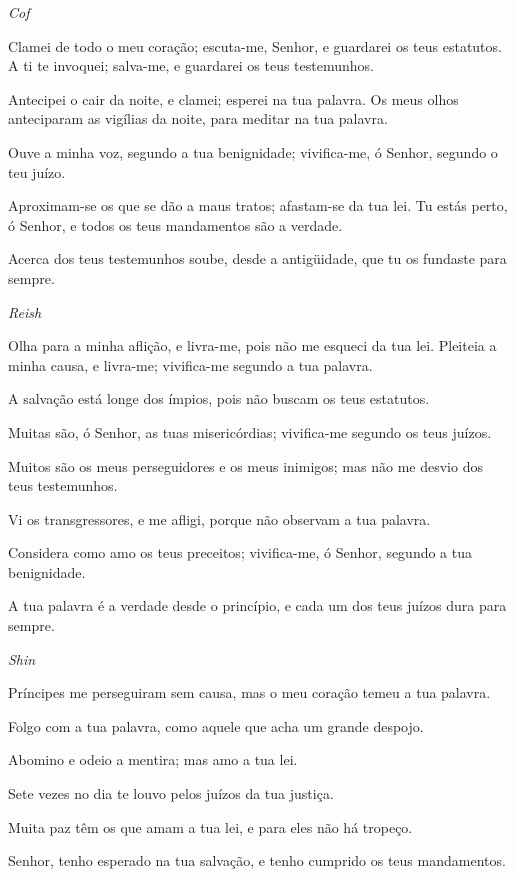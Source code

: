 \bigskip
\centerline{\emph{Cof}}

Clamei de todo o meu coração; escuta-me, Senhor, e guardarei os
teus estatutos. A ti te invoquei; salva-me, e guardarei os
teus testemunhos.

Antecipei o cair da noite, e clamei; esperei na tua palavra.
Os meus olhos anteciparam as vigílias da noite, para meditar
na tua palavra.

Ouve a minha voz, segundo a tua benignidade; vivifica-me, ó
Senhor, segundo o teu juízo.

Aproximam-se os que se dão a maus tratos; afastam-se da tua lei.
Tu estás perto, ó Senhor, e todos os teus mandamentos são a
verdade.

Acerca dos teus testemunhos soube, desde a antigüidade, que tu
os fundaste para sempre.

\bigskip
\bigskip

\centerline{\emph{Reish}}

Olha para a minha aflição, e livra-me, pois não me esqueci da
tua lei. Pleiteia a minha causa, e livra-me; vivifica-me
segundo a tua palavra.

A salvação está longe dos ímpios, pois não buscam os teus
estatutos.

Muitas são, ó Senhor, as tuas misericórdias; vivifica-me segundo
os teus juízos.

Muitos são os meus perseguidores e os meus inimigos; mas não me
desvio dos teus testemunhos.

Vi os transgressores, e me afligi, porque não observam a tua
palavra.

Considera como amo os teus preceitos; vivifica-me, ó Senhor,
segundo a tua benignidade.

A tua palavra é a verdade desde o princípio, e cada um dos teus
juízos dura para sempre.

\bigskip
\centerline{\emph{Shin}}

Príncipes me perseguiram sem causa, mas o meu coração temeu a
tua palavra.

Folgo com a tua palavra, como aquele que acha um grande despojo.

Abomino e odeio a mentira; mas amo a tua lei.

Sete vezes no dia te louvo pelos juízos da tua justiça.

Muita paz têm os que amam a tua lei, e para eles não há tropeço.

Senhor, tenho esperado na tua salvação, e tenho cumprido os teus
mandamentos.

